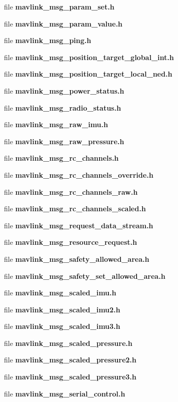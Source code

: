 \begin{DoxyCompactItemize}
\item 
file \textbf{ mavlink\+\_\+msg\+\_\+param\+\_\+set.\+h}
\item 
file \textbf{ mavlink\+\_\+msg\+\_\+param\+\_\+value.\+h}
\item 
file \textbf{ mavlink\+\_\+msg\+\_\+ping.\+h}
\item 
file \textbf{ mavlink\+\_\+msg\+\_\+position\+\_\+target\+\_\+global\+\_\+int.\+h}
\item 
file \textbf{ mavlink\+\_\+msg\+\_\+position\+\_\+target\+\_\+local\+\_\+ned.\+h}
\item 
file \textbf{ mavlink\+\_\+msg\+\_\+power\+\_\+status.\+h}
\item 
file \textbf{ mavlink\+\_\+msg\+\_\+radio\+\_\+status.\+h}
\item 
file \textbf{ mavlink\+\_\+msg\+\_\+raw\+\_\+imu.\+h}
\item 
file \textbf{ mavlink\+\_\+msg\+\_\+raw\+\_\+pressure.\+h}
\item 
file \textbf{ mavlink\+\_\+msg\+\_\+rc\+\_\+channels.\+h}
\item 
file \textbf{ mavlink\+\_\+msg\+\_\+rc\+\_\+channels\+\_\+override.\+h}
\item 
file \textbf{ mavlink\+\_\+msg\+\_\+rc\+\_\+channels\+\_\+raw.\+h}
\item 
file \textbf{ mavlink\+\_\+msg\+\_\+rc\+\_\+channels\+\_\+scaled.\+h}
\item 
file \textbf{ mavlink\+\_\+msg\+\_\+request\+\_\+data\+\_\+stream.\+h}
\item 
file \textbf{ mavlink\+\_\+msg\+\_\+resource\+\_\+request.\+h}
\item 
file \textbf{ mavlink\+\_\+msg\+\_\+safety\+\_\+allowed\+\_\+area.\+h}
\item 
file \textbf{ mavlink\+\_\+msg\+\_\+safety\+\_\+set\+\_\+allowed\+\_\+area.\+h}
\item 
file \textbf{ mavlink\+\_\+msg\+\_\+scaled\+\_\+imu.\+h}
\item 
file \textbf{ mavlink\+\_\+msg\+\_\+scaled\+\_\+imu2.\+h}
\item 
file \textbf{ mavlink\+\_\+msg\+\_\+scaled\+\_\+imu3.\+h}
\item 
file \textbf{ mavlink\+\_\+msg\+\_\+scaled\+\_\+pressure.\+h}
\item 
file \textbf{ mavlink\+\_\+msg\+\_\+scaled\+\_\+pressure2.\+h}
\item 
file \textbf{ mavlink\+\_\+msg\+\_\+scaled\+\_\+pressure3.\+h}
\item 
file \textbf{ mavlink\+\_\+msg\+\_\+serial\+\_\+control.\+h}

\end{DoxyCompactItemize}

